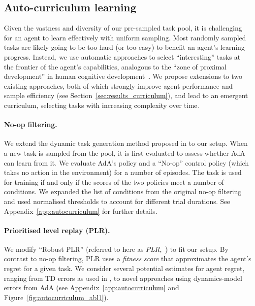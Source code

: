 \subsection{Auto-curriculum learning} \label{sec:methods_auto_curriculum}

Given the vastness and diversity of our pre-sampled task pool, it is challenging for an agent to learn effectively with uniform sampling. Most randomly sampled tasks are likely going to be too hard (or too easy) to benefit an agent's learning progress. Instead, we use automatic approaches to select ``interesting'' tasks at the frontier of the agent's capabilities, analogous to the ``zone of proximal development'' in human cognitive development~\citep{vygotsky1978}. We propose extensions to two existing approaches, both of which strongly improve agent performance and sample efficiency (see Section~\ref{sec:results_curriculum}), and lead to an emergent curriculum, selecting tasks with increasing complexity over time.

\paragraph{No-op filtering.} We extend the dynamic task generation method proposed in \citet[Section~5.2]{xland} to our setup. When a new task is sampled from the pool, it is first evaluated to assess whether AdA can learn from it. We evaluate AdA's policy and a ``No-op'' control policy (which takes no action in the environment) for a number of episodes. The task is used for training if and only if the scores of the two policies meet a number of conditions. We expanded the list of conditions from the original no-op filtering and used normalised thresholds to account for different trial durations. See Appendix~\ref{app:autocurriculum} for further details.

\paragraph{Prioritised level replay (PLR).} We modify ``Robust PLR'' (referred to here as \emph{PLR},~\citet{jiang2021robustplr}) to fit our setup. By contrast to no-op filtering, PLR uses a \emph{fitness score} \citep{Schmidhuber1991surprise} that approximates the agent's regret for a given task. We consider several potential estimates for agent regret, ranging from TD errors as used in \citet{jiang2020prioritized}, to novel approaches using dynamics-model errors from AdA (see Appendix~\ref{app:autocurriculum} and Figure~\ref{fig:autocurriculum_abl1}). 

